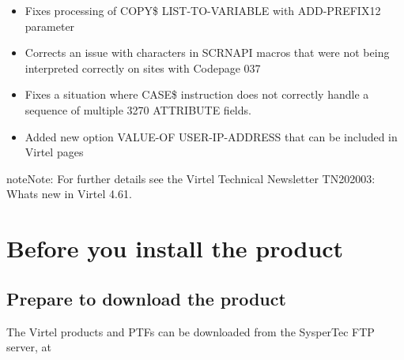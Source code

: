 \documentclass[letterpaper,10pt,english]{sphinxmanual}
\begin{document}
\begin{itemize}
\item {} 
Fixes processing of COPY\$ LIST-TO-VARIABLE with ADD-PREFIX12 parameter

\end{itemize}

\begin{itemize}
\item {} 
Corrects an issue with characters in SCRNAPI macros that were not being interpreted correctly on sites with Codepage 037

\end{itemize}

\begin{itemize}
\item {} 
Fixes a situation where CASE\$ instruction does not correctly handle a sequence of multiple 3270 ATTRIBUTE fields.

\end{itemize}

\begin{itemize}
\item {} 
Added new option VALUE-OF USER-IP-ADDRESS that can be included in Virtel pages

\end{itemize}

\begin{sphinxadmonition}{note}{Note:}
For further details see the Virtel Technical Newsletter TN202003: Whats new in Virtel 4.61.
\end{sphinxadmonition}


\chapter{Before you install the product}
\label{\detokenize{Getting_Started:before-you-install-the-product}}

\section{Prepare to download the product}
\label{\detokenize{Getting_Started:prepare-to-download-the-product}}
The Virtel products and PTFs can be downloaded from the SysperTec FTP server, at 
\end{document}
